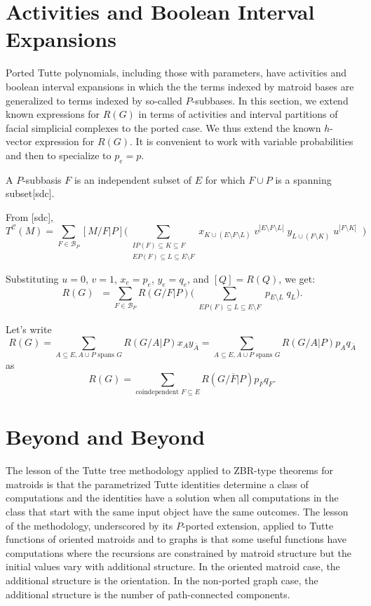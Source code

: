 \documentclass[12pt,leqno]{amsart}
\theoremstyle{remark}
\newcommand{\Card}[1]{\ensuremath{{\left|#1\right|}}}
\newcommand{\scomp}[1]{\ensuremath{\overline{#1}}}
\begin{document}
\section{Activities and Boolean Interval Expansions}

Ported Tutte polynomials, including those with parameters,
have activities and boolean interval expansions in which the
the terms indexed by matroid bases are generalized to
terms indexed by so-called $P$-subbases.  
In this section, we extend known expressions for $R(G)$ 
in terms of activities and interval partitions of facial
simplicial complexes to the ported case.  
We thus extend the known $h$-vector expression for $R(G)$.
It is convenient
to work with variable probabilities and then to specialize
to $p_e=p$.

A $P$-subbasis $F$
is an independent subset of $E$ for which $F\cup P$ is a spanning
subset[sdc].  

From [sdc],
\[
T^{\mathcal{C}}(M)=
\sum_{F\in \mathcal{B}_P}[M/F|P]
\Big(
\sum_{\substack{
       IP(F)\subseteq K \subseteq F\\
       EP(F)\subseteq L \subseteq E\setminus F
      }}
 x_{K\cup (E\setminus F\setminus L)}\;
 v^{\Card{E\setminus F\setminus L}}\;
 y_{L\cup (F\setminus K)}\;
 u^{\Card{F\setminus K}}\;\;
\Big)
\]

Substituting $u=0$, $v=1$, $x_e=p_e$, $y_e=q_e$, and $[Q]=R(Q)$, we get:
\[
R(G)\;\;=
\sum_{F\in \mathcal{B}_P}R(G/F|P)
\Big(
\sum_{\substack{
       EP(F)\subseteq L \subseteq E\setminus F
      }}
 p_{E\setminus L}\;
 q_{L}
\Big).
\]





Let's write
\[
R(G)=\sum_{A\subseteq E, A\cup P \text{ spans }G}
R(G/A|P)
x_A
y_{\scomp{A}} =
\sum_{A\subseteq E, A\cup P \text{ spans }G}
R(G/A|P)
p_A
q_{\scomp{A}}
\]
as
\[
R(G)=\sum_{\text{coindependent }F\subseteq E}
R(G/\scomp{F}|P)
p_{\scomp{F}}
q_F.
\]


\section{Beyond and Beyond}
The lesson of the Tutte tree methodology applied to ZBR-type 
theorems for matroids is that the parametrized Tutte identities determine a 
class of computations and the identities have a solution
when all computations in the class that start with
the same input object have the same outcomes.  The lesson
of the methodology, underscored by its $P$-ported 
extension, applied to Tutte functions of oriented matroids and to
graphs is that some useful functions have computations where
the recursions are constrained by matroid structure but
the initial values vary with additional structure.
In the oriented matroid case, the additional structure is
the orientation.  In the non-ported graph case, the additional
structure is the number of path-connected components.  
\end{document}
